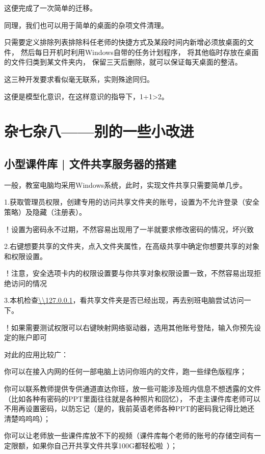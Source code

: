 \documentclass{article}
\begin{document}
        这便完成了一次简单的迁移。

        同理，我们也可以用于简单的桌面的杂项文件清理。
        
        只需要定义排除列表排除科任老师的快捷方式及某段时间内新增必须放桌面的文件，
        然后每日开机时利用Windows自带的任务计划程序，
        将其他临时存放在桌面的文件归类到某文件夹内，
        保留三天后删除，就可以保证每天桌面的整洁。

        这三种开发要求看似毫无联系，实则殊途同归。

        这便是模型化意识，在这样意识的指导下，1+1>2。

    \section{杂七杂八——别的一些小改进}
        \subsection{小型课件库 | 文件共享服务器的搭建}
        一般，教室电脑均采用Windows系统，此时，实现文件共享只需要简单几步。
        
        1.获取管理员权限，创建专用的访问共享文件夹的账号，设置为不允许登录（安全策略）及隐藏（注册表）。
        
        ！设置为密码永不过期，不然容易出现用了一半就要求修改密码的情况，坏兴致
        
        2.右键想要共享的文件夹，点入文件夹属性，在高级共享中确定你想要共享的对象和权限设置。
        
        ！注意，安全选项卡内的权限设置要与你共享对象权限设置一致，不然容易出现拒绝访问的情况

        3.本机检查\url{\\127.0.0.1}，看共享文件夹是否已经出现，再去别班电脑尝试访问一下。
        
        ！如果需要测试权限可以右键映射网络驱动器，选用其他账号登陆，输入你预先设定的账户即可

        对此的应用比较广：
        
        你可以在接入内网的任何一部电脑上访问你班内的文件，跑一些绿色版程序；

        你可以联系教师提供专供通道直达你班，放一些可能涉及班内信息不想透露的文件（比如各种有密码的PPT里面往往就是各种照片和回忆），
        不走主课件库老师可以不用再设置密码，以防忘记（是的，我前英语老师各种PPT的密码我记得比她还清楚呜呜呜）；
        
        你可以让老师放一些课件库放不下的视频（课件库每个老师的账号的存储空间有一定限额，如果你自己开共享文件共享100G都轻松啦~）；
\end{document}
